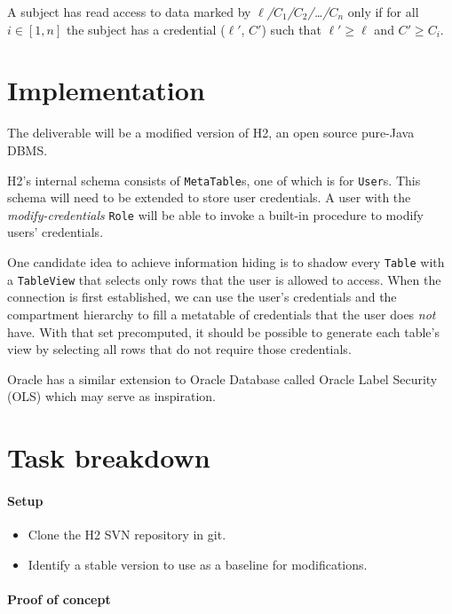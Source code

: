 \documentclass{article}
\begin{document}
A subject has read access to data marked by {\it $\ell$/$C_1$/$C_2$/\ldots/$C_n$} only if for all $i \in [1, n]$ the subject has a credential ($\ell'$, $C'$) such that $\ell' \ge \ell$ and $C' \ge C_i$.

\section{Implementation}

The deliverable will be a modified version of H2\cite{h2}, an open source pure-Java DBMS.

H2's internal schema consists of {\tt MetaTable}s, one of which is for {\tt User}s. This schema will need to be extended to store user credentials. A user with the {\it modify-credentials} {\tt Role} will be able to invoke a built-in procedure to modify users' credentials.

One candidate idea to achieve information hiding is to shadow every {\tt Table} with a {\tt TableView} that selects only rows that the user is allowed to access. When the connection is first established, we can use the user's credentials and the compartment hierarchy to fill a metatable of credentials that the user does {\it not} have. With that set precomputed, it should be possible to generate each table's view by selecting all rows that do not require those credentials.

Oracle has a similar extension to Oracle Database called Oracle Label Security (OLS)\cite{ols} which may serve as inspiration.

\pagebreak

\section{Task breakdown}

\paragraph{Setup}

\begin{itemize}
\item Clone the H2 SVN repository in git.
\item Identify a stable version to use as a baseline for modifications.
\end{itemize}

\paragraph{Proof of concept}
\end{document}
